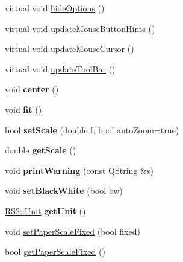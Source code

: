 \begin{DoxyCompactItemize}
virtual void \hyperlink{classRS__ActionPrintPreview_a4142b19097897d53a020d7a8c04d750a}{hide\-Options} ()
\item 
virtual void \hyperlink{classRS__ActionPrintPreview_abeb4f74bc6bc29375f5b607f1e8a83fe}{update\-Mouse\-Button\-Hints} ()
\item 
virtual void \hyperlink{classRS__ActionPrintPreview_a59660c827b6b07b9383f425f4bb02149}{update\-Mouse\-Cursor} ()
\item 
virtual void \hyperlink{classRS__ActionPrintPreview_aebc189d3e355916b203ca723a3d45812}{update\-Tool\-Bar} ()
\item 
\hypertarget{classRS__ActionPrintPreview_acc6f851f4249ab53d438519c72c0e6af}{void {\bfseries center} ()}\label{classRS__ActionPrintPreview_acc6f851f4249ab53d438519c72c0e6af}

\item 
\hypertarget{classRS__ActionPrintPreview_adcd14d1be2fa4b42653703596bc8d9a1}{void {\bfseries fit} ()}\label{classRS__ActionPrintPreview_adcd14d1be2fa4b42653703596bc8d9a1}

\item 
\hypertarget{classRS__ActionPrintPreview_a15ba040301bcd40a5c573b700cec43b5}{bool {\bfseries set\-Scale} (double f, bool auto\-Zoom=true)}\label{classRS__ActionPrintPreview_a15ba040301bcd40a5c573b700cec43b5}

\item 
\hypertarget{classRS__ActionPrintPreview_a2b5dc6b580f9c4c432e7db7fe0c8a90d}{double {\bfseries get\-Scale} ()}\label{classRS__ActionPrintPreview_a2b5dc6b580f9c4c432e7db7fe0c8a90d}

\item 
\hypertarget{classRS__ActionPrintPreview_a1e1c7c27e7d576b2b16938e72e00371f}{void {\bfseries print\-Warning} (const Q\-String \&s)}\label{classRS__ActionPrintPreview_a1e1c7c27e7d576b2b16938e72e00371f}

\item 
\hypertarget{classRS__ActionPrintPreview_a0caf0150b0063c3db531bf65df3d3698}{void {\bfseries set\-Black\-White} (bool bw)}\label{classRS__ActionPrintPreview_a0caf0150b0063c3db531bf65df3d3698}

\item 
\hypertarget{classRS__ActionPrintPreview_a593c5715fac97ae61287f09994ac9837}{\hyperlink{classRS2_ad859751df6978737e4f35ec111ff9828}{R\-S2\-::\-Unit} {\bfseries get\-Unit} ()}\label{classRS__ActionPrintPreview_a593c5715fac97ae61287f09994ac9837}

\item 
void \hyperlink{classRS__ActionPrintPreview_a8f03b3be222465f31b96350159fca929}{set\-Paper\-Scale\-Fixed} (bool fixed)
\item 
bool \hyperlink{classRS__ActionPrintPreview_a5d64b851969cef147b8ab91a6cfd3b9e}{get\-Paper\-Scale\-Fixed} ()
\end{DoxyCompactItemize}
